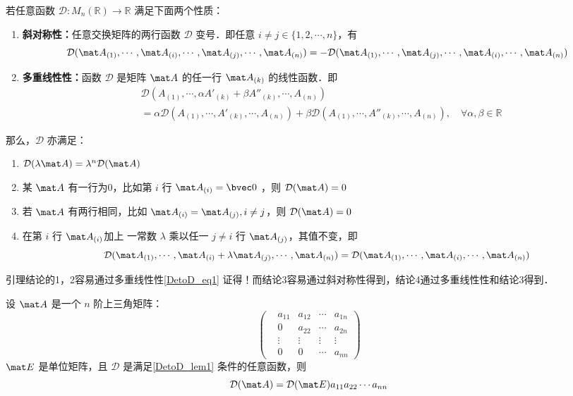 \begin{lemma}{}\label{DetoD_lem1}
若任意函数 $\mathcal D:M_n(\mathbb R)\rightarrow \mathbb R$ 满足下面两个性质：
\begin{enumerate}
\item \textbf{斜对称性：}任意交换矩阵的两行函数 $\mathcal D$ 变号．即任意 $i\neq j\in \{1,2,\cdots,n\}$，有
\begin{equation}
\mathcal D(\mat A_{(1)},\cdots,\mat A_{(i)},\cdots,\mat A_{(j)},\cdots,\mat A_{(n)})=-\mathcal D(\mat A_{(1)},\cdots,\mat A_{(j)},\cdots,\mat A_{(i)},\cdots,\mat A_{(n)})
\end{equation}
\item \textbf{多重线性性：}函数 $\mathcal D$ 是矩阵 $\mat A$ 的任一行 $\mat A_{(k)}$ 的线性函数．即
\begin{equation}\label{DetoD_eq1}
\begin{aligned}
&\mathcal D(A_{(1)},\cdots,\alpha A'_{(k)}+\beta A''_{(k)},\cdots,A_{(n)})\\
&=\alpha\mathcal D(A_{(1)},\cdots,A'_{(k)},\cdots,A_{(n)})+\beta\mathcal D(A_{(1)},\cdots,A''_{(k)},\cdots,A_{(n)}),\quad\forall\alpha,\beta\in\mathbb R
\end{aligned}
\end{equation}
\end{enumerate}
那么，$\mathcal D$ 亦满足：
\begin{enumerate}
\item $\mathcal D(\lambda\mat A)=\lambda^n\mathcal D(\mat A)$
\item 某 $\mat A$ 有一行为0，比如第 $i$ 行 $\mat A_{(i)}=\bvec 0$ ，则 $\mathcal D(\mat A)=0$
\item 若 $\mat A$ 有两行相同，比如 $\mat A_{(i)}=\mat A_{(j)},i\neq j$，则 $\mathcal D(\mat A)=0$
\item 在第 $i$ 行 $\mat A_{(i)}$加上 一常数 $\lambda$ 乘以任一 $j\neq i$ 行 $\mat A_{(j)}$，其值不变，即
\begin{equation}
\mathcal D(\mat A_{(1)},\cdots,\mat A_{(i)}+\lambda \mat A_{(j)},\cdots,\mat A_{(n)})=\mathcal D(\mat A_{(1)},\cdots,\mat A_{(i)},\cdots,\mat A_{(n)})
\end{equation}
\end{enumerate}
\end{lemma}
引理结论的1，2容易通过多重线性性\autoref{DetoD_eq1} 证得！而结论3容易通过斜对称性得到，结论4通过多重线性性和结论3得到．

\begin{lemma}{}
设 $\mat A$ 是一个 $n$ 阶上三角矩阵：
\begin{equation}
\begin{pmatrix}
&a_{11}&a_{12}&\cdots&a_{1n}\\
&0&a_{22}&\cdots&a_{2n}\\
&\vdots&\vdots&\vdots&\vdots\\
&0&0&\cdots&a_{nn}
\end{pmatrix}
\end{equation}
$\mat E$ 是单位矩阵，且 $\mathcal D$ 是满足\autoref{DetoD_lem1} 条件的任意函数，则
\begin{equation}
\mathcal D(\mat A)=\mathcal D(\mat E)a_{11}a_{22}\cdots a_{nn}
\end{equation}
\end{lemma}

